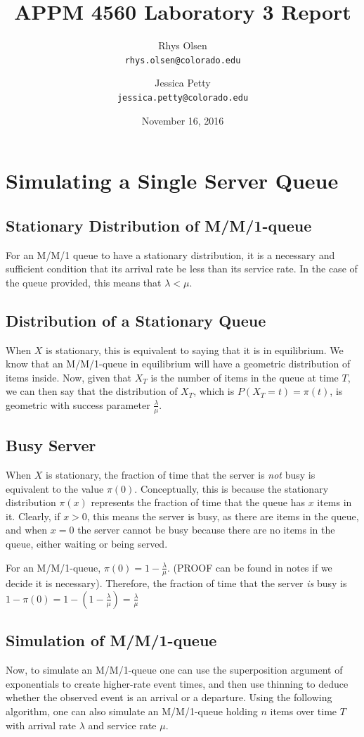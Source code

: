 \documentclass[11pt, oneside]{article}
\title{APPM 4560 Laboratory 3 Report}
\author{Rhys Olsen\\
\texttt{rhys.olsen@colorado.edu}
 \and Jessica Petty\\
 \texttt{jessica.petty@colorado.edu}
 }
\date{November 16, 2016}
\begin{document}
\maketitle
\section{Simulating a Single Server Queue}
\subsection{Stationary Distribution of M/M/1-queue}
For an M/M/1 queue to have a stationary distribution, it is a necessary and sufficient condition that its arrival rate be less than its service rate. In the case of the queue provided, this means that $\lambda < \mu$.

\subsection{Distribution of a Stationary Queue}
When $X$ is stationary, this is equivalent to saying that it is in equilibrium. We know that an M/M/1-queue in equilibrium will have a geometric distribution of items inside. Now, given that $X_T$ is the number of items in the queue at time $T$, we can then say that the distribution of $X_T$, which is $P(X_T = t) = \pi(t)$, is geometric with success parameter $\frac{\lambda}{\mu}$.

\subsection{Busy Server}
When $X$ is stationary, the fraction of time that the server is \textit{not} busy is equivalent to the value $\pi(0)$. Conceptually, this is because the stationary distribution $\pi(x)$ represents the fraction of time that the queue has $x$ items in it. Clearly, if $x > 0$, this means the server is busy, as there are items in the queue, and when $x=0$ the server cannot be busy because there are no items in the queue, either waiting or being served.

For an M/M/1-queue, $\pi(0)=1-\frac{\lambda}{\mu}$. (PROOF can be found in notes if we decide it is necessary). Therefore, the fraction of time that the server \textit{is} busy is $1-\pi(0)=1-(1-\frac{\lambda}{\mu})=\frac{\lambda}{\mu}$

\subsection{Simulation of M/M/1-queue}
Now, to simulate an M/M/1-queue one can use the superposition argument of exponentials to create higher-rate event times, and then use thinning to deduce whether the observed event is an arrival or a departure. Using the following algorithm, one can also simulate an M/M/1-queue holding $n$ items over time $T$ with arrival rate $\lambda$ and service rate $\mu$.
\end{document}
